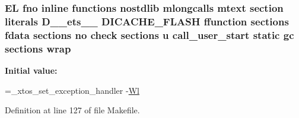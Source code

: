 \hypertarget{Makefile_a6b04d3dc9ff8a69521845b59ef6c33f1}{
\subsubsection[{wrap}]{\setlength{\rightskip}{0pt plus 5cm}E\-L fno inline functions nostdlib mlongcalls mtext section literals D\-\_\-\-\_\-ets\-\_\-\-\_\- D\-I\-C\-A\-C\-H\-E\-\_\-\-F\-L\-A\-S\-H ffunction sections fdata sections no check sections u call\-\_\-user\-\_\-start static gc sections wrap\hspace{0.3cm}{\ttfamily [static]}}}\label{Makefile_a6b04d3dc9ff8a69521845b59ef6c33f1}
{\bfseries Initial value\-:}
\begin{DoxyCode}
=\_xtos\_set\_exception\_handler 
    -\hyperlink{Makefile_a1af3a6ecef406b93f1a1db145b2cfd43}{Wl}
\end{DoxyCode}


Definition at line 127 of file Makefile.

